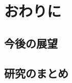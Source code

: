 \chapter{おわりに}
\label{ch:con}

\quad

\section{今後の展望}
\label{sec:con_future}

\section{研究のまとめ}
\label{sec:con_fin}

